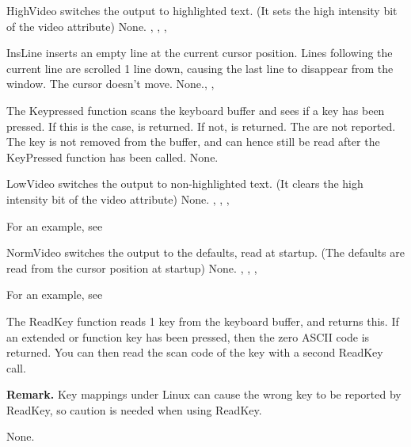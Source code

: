 

{ HighVideo switches the output to highlighted text. (It sets the high
intensity bit of the video attribute)
}
{None.}{ , , ,
}



{ InsLine inserts an empty line at the current cursor position. 
Lines following the current line are scrolled 1 line down, 
causing the last line to disappear from the window. 
The cursor doesn't move.}
{None.}{, , }



{ The Keypressed function scans the keyboard buffer and sees if a key has
been pressed. If this is the case,  is returned. If not,
 is returned. The  are not reported.
The key is not removed from the buffer, and can hence still be read after
the KeyPressed function has been called.
}
{None.}{}



{ LowVideo switches the output to non-highlighted text. (It clears the high
intensity bit of the video attribute)
}
{None.}{ , , ,
}

For an example, see 

{ NormVideo switches the output to the defaults, read at startup. (The
defaults are read from the cursor position at startup)
}
{None.}{ , , ,
}

For an example, see 




{
The ReadKey function reads 1 key from the keyboard buffer, and returns this.
If an extended or function key has been pressed, then the zero ASCII code is 
returned. You can then read the scan code of the key with a second ReadKey
call.

\textbf{Remark.} Key mappings under Linux can cause the wrong key to be
reported by ReadKey, so caution is needed when using ReadKey.  
}
{None.}{}

